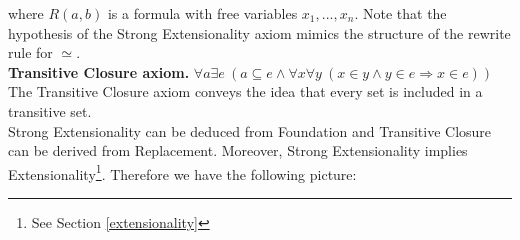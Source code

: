 \documentclass[submission,copyright,creativecommons]{eptcs}
\def\imp{\mathbin{\Rightarrow}}
\def\fa{{\forall}}
\def\conj{\mathbin{\wedge}}
\def\ex{{\exists}}
\begin{document}
where $R(a,b)$ is a formula with free variables $x_1, ..., x_n$. Note that the hypothesis of the Strong Extensionality axiom mimics the structure of the rewrite rule for $\simeq$.
\\

\textbf{Transitive Closure axiom.} $\fa a\ex e~(a \subseteq e \conj \fa x\fa y~(x \in y \conj y \in e \imp x \in e))$ \\

The Transitive Closure axiom conveys the idea that every set is included in a transitive set. \\

Strong Extensionality can be deduced from Foundation and Transitive Closure can be derived from Replacement. Moreover, Strong Extensionality implies Extensionality\footnote{See Section \ref{extensionality}}. Therefore we have the following picture:



\begin{center}
\end{center}
\end{document}
